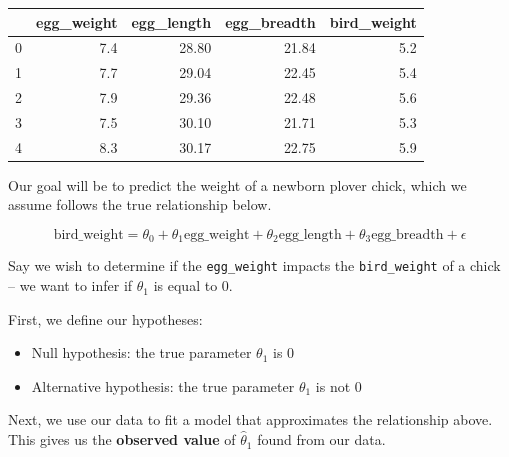 \documentclass[
  letterpaper,
  DIV=11,
  numbers=noendperiod]{scrreprt}
\providecommand{\tightlist}{%
  \setlength{\itemsep}{0pt}\setlength{\parskip}{0pt}}\usepackage{longtable,booktabs,array}
\begin{document}
\begin{tabular}{lrrrr}
\toprule
{} &  egg\_weight &  egg\_length &  egg\_breadth &  bird\_weight \\
\midrule
0 &         7.4 &       28.80 &        21.84 &          5.2 \\
1 &         7.7 &       29.04 &        22.45 &          5.4 \\
2 &         7.9 &       29.36 &        22.48 &          5.6 \\
3 &         7.5 &       30.10 &        21.71 &          5.3 \\
4 &         8.3 &       30.17 &        22.75 &          5.9 \\
\bottomrule
\end{tabular}

Our goal will be to predict the weight of a newborn plover chick, which
we assume follows the true relationship below.

\[\text{bird\_weight} = \theta_0 + \theta_1 \text{egg_weight} + \theta_2 \text{egg_length} + \theta_3 \text{egg_breadth} + \epsilon\]

Say we wish to determine if the \texttt{egg\_weight} impacts the
\texttt{bird\_weight} of a chick -- we want to infer if \(\theta_1\) is
equal to 0.

First, we define our hypotheses:

\begin{itemize}
\tightlist
\item
  Null hypothesis: the true parameter \(\theta_1\) is 0
\item
  Alternative hypothesis: the true parameter \(\theta_1\) is not 0
\end{itemize}

Next, we use our data to fit a model that approximates the relationship
above. This gives us the \textbf{observed value} of \(\hat{\theta}_1\)
found from our data.
\end{document}
